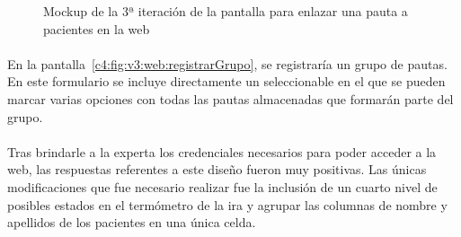 \begin{figure}[H]
    \centering
    \caption[Mockup de la 3ª iteración de la pantalla para enlazar una pauta a pacientes en la web]{Mockup de la 3ª iteración de la pantalla para enlazar una pauta a pacientes en la web}
    \label{c4:fig:v3:web:enlazarPautaPacientes}
\end{figure}

\paragraph{}
En la pantalla~\ref{c4:fig:v3:web:registrarGrupo}, se registraría un grupo de pautas. En este formulario se incluye directamente un seleccionable en el que se pueden marcar varias opciones con todas las pautas almacenadas que formarán parte del grupo.

\paragraph{}
Tras brindarle a la experta los credenciales necesarios para poder acceder a la web, las respuestas referentes a este diseño fueron muy positivas. Las únicas modificaciones que fue necesario realizar fue la inclusión de un cuarto nivel de posibles estados en el termómetro de la ira y agrupar las columnas de nombre y apellidos de los pacientes en una única celda.

